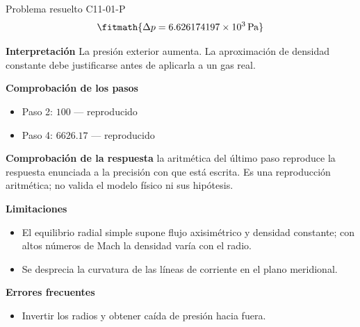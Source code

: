 \documentclass[10pt,openany]{book}
\begin{document}
\begin{studiumworked}{Problema resuelto C11-01-P}
\[
\fitmath{\Delta p=6.626174197\times10^{3}\,\mathrm{Pa}}
\]

\noindent\textbf{Interpretación}
La presión exterior aumenta. La aproximación de densidad constante debe justificarse antes de aplicarla a un gas real.

\noindent\textbf{Comprobación de los pasos}
\begin{itemize}
\item Paso 2: $100$ — reproducido
\item Paso 4: $6626.17$ — reproducido
\end{itemize}

\noindent\textbf{Comprobación de la respuesta} la aritmética del último paso reproduce la respuesta enunciada a la precisión con que está escrita. Es una reproducción aritmética; no valida el modelo físico ni sus hipótesis.

\noindent\textbf{Limitaciones}
\begin{itemize}
\item El equilibrio radial simple supone flujo axisimétrico y densidad constante; con altos números de Mach la densidad varía con el radio.
\item Se desprecia la curvatura de las líneas de corriente en el plano meridional.
\end{itemize}

\noindent\textbf{Errores frecuentes}
\begin{itemize}
\item Invertir los radios y obtener caída de presión hacia fuera.
\end{itemize}
\end{studiumworked}
\end{document}
